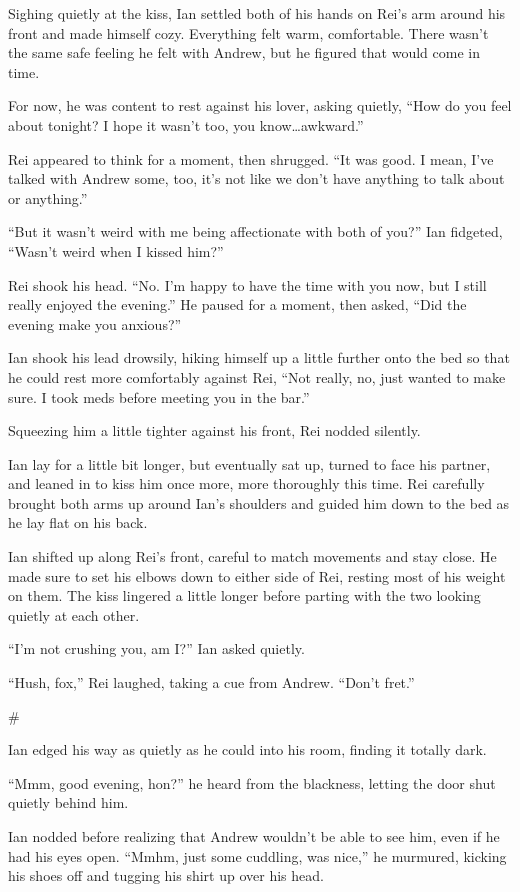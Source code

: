 \documentclass[12pt,letterpaper,oneside]{memoir}
\newcommand\secdiv{
  \begin{center}
    \#
  \end{center}
}
\begin{document}
  Sighing quietly at the kiss, Ian settled both of his hands on Rei's arm around his front and made himself cozy. Everything felt warm, comfortable. There wasn't the same safe feeling he felt with Andrew, but he figured that would come in time.

  For now, he was content to rest against his lover, asking quietly, ``How do you feel about tonight? I hope it wasn't too, you know\ldots{}awkward.''

  Rei appeared to think for a moment, then shrugged. ``It was good. I mean, I've talked with Andrew some, too, it's not like we don't have anything to talk about or anything.''

  ``But it wasn't weird with me being affectionate with both of you?'' Ian fidgeted, ``Wasn't weird when I kissed him?''

  Rei shook his head. ``No. I'm happy to have the time with you now, but I still really enjoyed the evening.'' He paused for a moment, then asked, ``Did the evening make you anxious?''

  Ian shook his lead drowsily, hiking himself up a little further onto the bed so that he could rest more comfortably against Rei, ``Not really, no, just wanted to make sure. I took meds before meeting you in the bar.''

  Squeezing him a little tighter against his front, Rei nodded silently.

  Ian lay for a little bit longer, but eventually sat up, turned to face his partner, and leaned in to kiss him once more, more thoroughly this time. Rei carefully brought both arms up around Ian's shoulders and guided him down to the bed as he lay flat on his back.

  Ian shifted up along Rei's front, careful to match movements and stay close. He made sure to set his elbows down to either side of Rei, resting most of his weight on them. The kiss lingered a little longer before parting with the two looking quietly at each other.

  ``I'm not crushing you, am I?'' Ian asked quietly.

  ``Hush, fox,'' Rei laughed, taking a cue from Andrew. ``Don't fret.''

  \secdiv

  Ian edged his way as quietly as he could into his room, finding it totally dark.

  ``Mmm, good evening, hon?'' he heard from the blackness, letting the door shut quietly behind him.

  Ian nodded before realizing that Andrew wouldn't be able to see him, even if he had his eyes open. ``Mmhm, just some cuddling, was nice,'' he murmured, kicking his shoes off and tugging his shirt up over his head.
\end{document}
